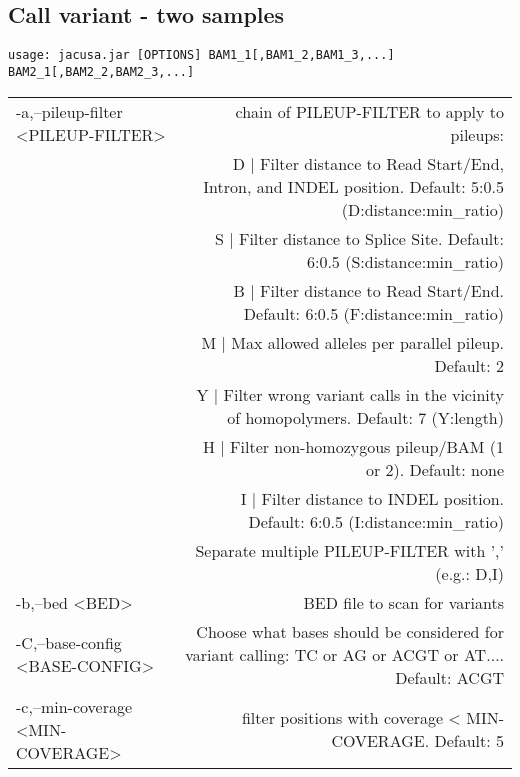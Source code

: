 \documentclass[12pt, a4paper]{article}
\begin{document}
\subsection{Call variant - two samples}
\begin{verbatim}
usage: jacusa.jar [OPTIONS] BAM1_1[,BAM1_2,BAM1_3,...] BAM2_1[,BAM2_2,BAM2_3,...]
\end{verbatim}
\begin{table}
\begin{tabular}{lr}
 -a,--pileup-filter <PILEUP-FILTER>             & chain of PILEUP-FILTER to apply to pileups: \\
                                                & D | Filter distance to Read Start/End, Intron, and INDEL position. Default: 5:0.5 (D:distance:min\_ratio) \\
                                                & S | Filter distance to Splice Site. Default: 6:0.5 (S:distance:min\_ratio) \\
                                                & B | Filter distance to Read Start/End. Default: 6:0.5 (F:distance:min\_ratio) \\
                                                & M | Max allowed alleles per parallel pileup. Default: 2 \\ 
                                                & Y | Filter wrong variant calls in the vicinity of homopolymers. Default: 7 (Y:length) \\
                                                & H | Filter non-homozygous pileup/BAM (1 or 2). Default: none \\
                                                & I | Filter distance to INDEL position. Default: 6:0.5 (I:distance:min\_ratio) \\
                                                & Separate multiple PILEUP-FILTER with ',' (e.g.: D,I) \\
 -b,--bed <BED>									& BED file to scan for variants \\
 -C,--base-config <BASE-CONFIG> 				& Choose what bases should be considered for variant calling: TC or AG or ACGT or AT$\ldots$. Default: ACGT \\
 -c,--min-coverage <MIN-COVERAGE>               & filter positions with coverage < MIN-COVERAGE. Default: 5 \\

\end{tabular}
\end{table}
\end{document}
